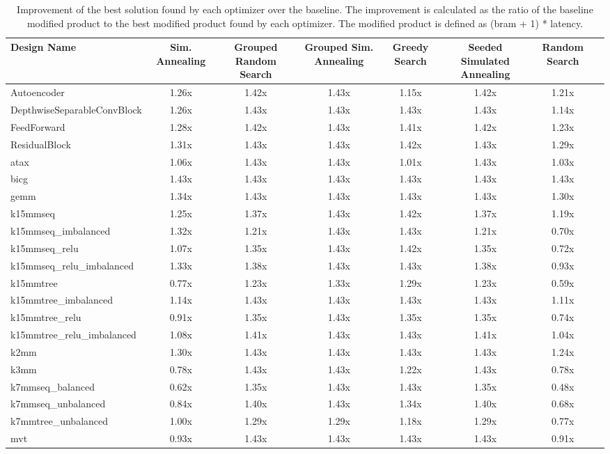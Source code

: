 \begin{table}[th]
\caption{Improvement of the best solution found by each optimizer over the baseline. The improvement is calculated as the ratio of the baseline modified product to the best modified product found by each optimizer. The modified product is defined as (bram + 1) * latency.}
\label{tab:improvement}
\begin{tabular}{lccccccc}
\toprule
Design Name & Sim. Annealing & Grouped Random Search & Grouped Sim. Annealing & Greedy Search & Seeded Simulated Annealing & Random Search \\
\midrule
Autoencoder & 1.26x & 1.42x & 1.43x & 1.15x & 1.42x & 1.21x \\
DepthwiseSeparableConvBlock & 1.26x & 1.43x & 1.43x & 1.43x & 1.43x & 1.14x \\
FeedForward & 1.28x & 1.42x & 1.43x & 1.41x & 1.42x & 1.23x \\
ResidualBlock & 1.31x & 1.43x & 1.43x & 1.42x & 1.43x & 1.29x \\
atax & 1.06x & 1.43x & 1.43x & 1.01x & 1.43x & 1.03x \\
bicg & 1.43x & 1.43x & 1.43x & 1.43x & 1.43x & 1.43x \\
gemm & 1.34x & 1.43x & 1.43x & 1.43x & 1.43x & 1.30x \\
k15mmseq & 1.25x & 1.37x & 1.43x & 1.42x & 1.37x & 1.19x \\
k15mmseq\_imbalanced & 1.32x & 1.21x & 1.43x & 1.43x & 1.21x & 0.70x \\
k15mmseq\_relu & 1.07x & 1.35x & 1.43x & 1.42x & 1.35x & 0.72x \\
k15mmseq\_relu\_imbalanced & 1.33x & 1.38x & 1.43x & 1.43x & 1.38x & 0.93x \\
k15mmtree & 0.77x & 1.23x & 1.33x & 1.29x & 1.23x & 0.59x \\
k15mmtree\_imbalanced & 1.14x & 1.43x & 1.43x & 1.43x & 1.43x & 1.11x \\
k15mmtree\_relu & 0.91x & 1.35x & 1.43x & 1.35x & 1.35x & 0.74x \\
k15mmtree\_relu\_imbalanced & 1.08x & 1.41x & 1.43x & 1.43x & 1.41x & 1.04x \\
k2mm & 1.30x & 1.43x & 1.43x & 1.43x & 1.43x & 1.24x \\
k3mm & 0.78x & 1.43x & 1.43x & 1.22x & 1.43x & 0.78x \\
k7mmseq\_balanced & 0.62x & 1.35x & 1.43x & 1.43x & 1.35x & 0.48x \\
k7mmseq\_unbalanced & 0.84x & 1.40x & 1.43x & 1.34x & 1.40x & 0.68x \\
k7mmtree\_unbalanced & 1.00x & 1.29x & 1.29x & 1.18x & 1.29x & 0.77x \\
mvt & 0.93x & 1.43x & 1.43x & 1.43x & 1.43x & 0.91x \\
\bottomrule
\end{tabular}
\end{table}
